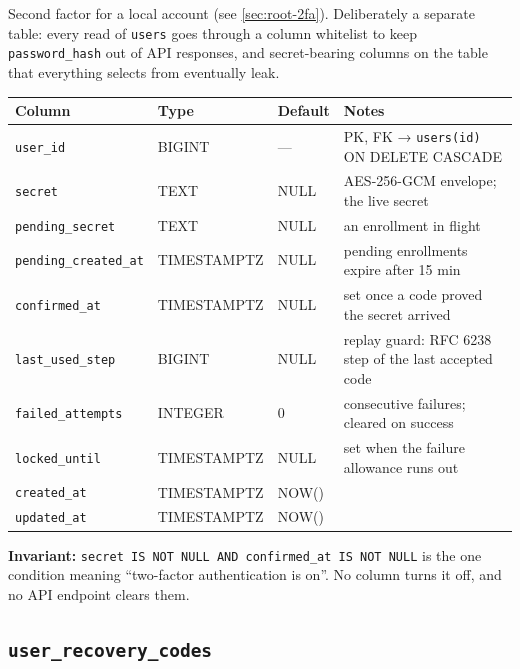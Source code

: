 \documentclass[12pt,a4paper,twoside]{report}
\newcommand{\code}[1]{\texttt{#1}}
\begin{document}
Second factor for a local account (see \autoref{sec:root-2fa}). Deliberately a
separate table: every read of \code{users} goes through a column whitelist to
keep \code{password\_hash} out of API responses, and secret-bearing columns on
the table that everything selects from eventually leak.

\begin{table}[H]
  \centering\small
  \begin{tabular}{@{}llll@{}}
    \toprule
    \textbf{Column} & \textbf{Type} & \textbf{Default} & \textbf{Notes} \\
    \midrule
    \code{user\_id}            & BIGINT      & ---   & PK, FK → \code{users(id)} ON DELETE CASCADE \\
    \code{secret}              & TEXT        & NULL  & AES-256-GCM envelope; the live secret \\
    \code{pending\_secret}     & TEXT        & NULL  & an enrollment in flight \\
    \code{pending\_created\_at}& TIMESTAMPTZ & NULL  & pending enrollments expire after 15 min \\
    \code{confirmed\_at}       & TIMESTAMPTZ & NULL  & set once a code proved the secret arrived \\
    \code{last\_used\_step}    & BIGINT      & NULL  & replay guard: RFC 6238 step of the last accepted code \\
    \code{failed\_attempts}    & INTEGER     & 0     & consecutive failures; cleared on success \\
    \code{locked\_until}       & TIMESTAMPTZ & NULL  & set when the failure allowance runs out \\
    \code{created\_at}         & TIMESTAMPTZ & NOW() & \\
    \code{updated\_at}         & TIMESTAMPTZ & NOW() & \\
    \bottomrule
  \end{tabular}
\end{table}

\noindent\textbf{Invariant:} \code{secret IS NOT NULL AND confirmed\_at IS NOT
NULL} is the one condition meaning ``two-factor authentication is on''. No column
turns it off, and no API endpoint clears them.

\subsection*{\texttt{user\_recovery\_codes}}
\end{document}
